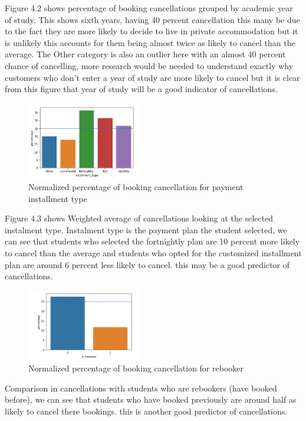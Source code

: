   
Figure 4.2 shows percentage of booking cancellations grouped by academic year of study. This shows sixth years, having 40 percent cancellation this many be due to the fact they are more likely to decide to live in private accommodation but it is unlikely this accounts for them being almost twice as likely to cancel than the average. The Other category is also an outlier here with an almost 40 percent chance of cancelling, more research would be needed to understand exactly why customers who don't enter a year of study are more likely to cancel but it is clear from this figure that year of study will be a good indicator of cancellations.

\vspace{5mm}
  
  \begin{figure}[H]
\includegraphics[width=5cm]{figures/instalment_type.png}
 \caption{Normalized percentage of booking cancellation for payment installment type}
\end{figure}
  
  
 Figure 4.3 shows Weighted average of cancellations looking at the selected instalment type. Instalment type is the payment plan the student selected, we can see that students who selected the fortnightly plan are 10 percent more likely to cancel than the average and students who opted for the customized installment plan are around 6 percent less likely to cancel. this may be a good predictor of cancellations.
  
  
   \begin{figure}[H]
\includegraphics[width=5cm]{figures/is_rebooker.png}
 \caption{Normalized percentage of booking cancellation for rebooker}
\end{figure}
  
 Comparison in cancellations with students who are rebookers (have booked before), we can see that students who have booked previously are around half as likely to cancel there bookings. this is another good predictor of cancellations.  
 
